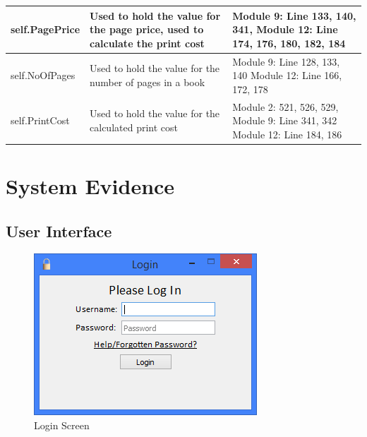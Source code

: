 \begin{center}
\begin{tabular}{|p{3cm}|p{4cm}|p{3cm}|}
    \hline
    self.PagePrice & Used to hold the value for the page price, used to calculate the print cost & Module 9: Line 133, 140, 341, Module 12: Line 174, 176, 180, 182, 184 \\ \hline
    self.NoOfPages & Used to hold the value for the number of pages in a book & Module 9: Line 128, 133, 140 \newline Module 12: Line 166, 172, 178 \\ \hline
    self.PrintCost & Used to hold the value for the calculated print cost & Module 2: 521, 526, 529, \newline Module 9: Line 341, 342 \newline Module 12: Line 184, 186 \\ \hline
    \hline     
\end{tabular}
\end{center}

\section{System Evidence}

\subsection{User Interface}

\begin{figure}[H]
    \caption{Login Screen} \label{fig:LoginScreen}
    \includegraphics[width=\textwidth]{./Maintenance/UserInterface/LoginScreen.png}
\end{figure}


